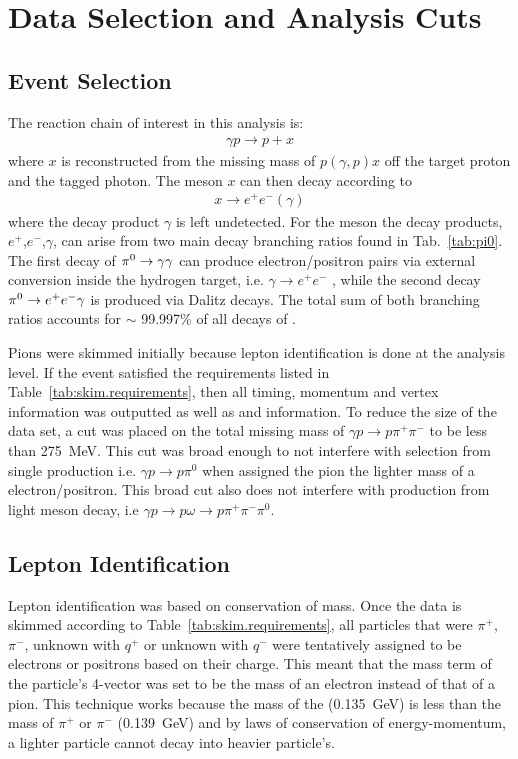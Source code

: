 \section{Data Selection and Analysis Cuts}\label{sec:evnt}
\subsection{Event Selection}\label{subsec:evnt}
	The reaction chain of interest in this analysis is:
	\begin{align}
	\gamma p \rightarrow p + x
	\end{align}
	where $x$ is reconstructed from the missing mass of $p(\gamma,p)x$ off the target proton and the tagged photon. The meson $x$ can then decay according to  
	\begin{align}
	x\rightarrow e^{+}e^{-}(\gamma)
	\end{align}
	where the decay product $\gamma$ is left undetected. For the \pizT meson the decay products, $e^+$,$e^-$,$\gamma$, can arise from two main decay branching ratios found in Tab.~\ref{tab:pi0}. The first decay of $\pi^{0}\rightarrow\gamma\gamma$ can produce electron/positron pairs via external conversion inside the hydrogen target, i.e. $\gamma\rightarrow e^+e^-$ , while the second decay $\pi^{0}\rightarrow e^+e^-\gamma$ is produced via Dalitz decays. The total sum of both branching ratios accounts for $\sim$ 99.997\% of all decays of \pizT.
	
	\FloatBarrier
	Pions were skimmed initially because lepton identification is done at the analysis level. If the event satisfied the requirements listed in Table~\ref{tab:skim.requirements}, then all timing, momentum and vertex information was 
	outputted as well as  and  information. To reduce the size of the data set, a cut 
	was placed on the total missing mass of $\gamma p \to p \pi^{+} \pi^{-}$ to be less than 275~MeV. This cut was broad enough to not interfere with \pizT selection from single 
	\pizT production i.e. $\gamma p \to p \pi^{0}$ when assigned the pion the lighter mass of a electron/positron. This broad cut also does not interfere with \pizT production from 
	light meson decay, i.e $\gamma p \to p \omega \to p \pi^{+} \pi^{-} \pi^{0}$. 
		
	
	\FloatBarrier
\subsection{Lepton Identification}
	Lepton identification was based on conservation of mass. Once the data is skimmed according to Table~\ref{tab:skim.requirements}, all particles that were $\pi^+$, $\pi^-$, unknown with $q^+$ or unknown with $q^-$ were tentatively assigned to be electrons or positrons based on their charge. This meant that the mass term of the particle's 4-vector was set to be the mass of an electron instead of that of a pion. This technique works because the mass of the \pizT (0.135~GeV) is less than the mass of $\pi^+$ or $\pi^-$ (0.139~GeV) and by laws of conservation of energy-momentum, a lighter particle cannot decay into heavier particle's.
	


